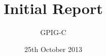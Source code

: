 \documentclass[10pt,a4paper]{article}
\begin{document}
\title{Initial Report}
\author{GPIG-C}
\date{25th October 2013}
\maketitle
\end{document}
